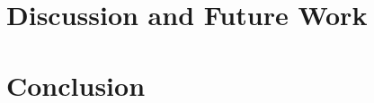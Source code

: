 \documentclass[preprint,journal]{vgtc}       %
\begin{document}
\section{Discussion and Future Work}
  \label{sec:discussion}
  

\section{Conclusion}
  \label{sec:conclusion}
  


%
%
%
%


\end{document}
